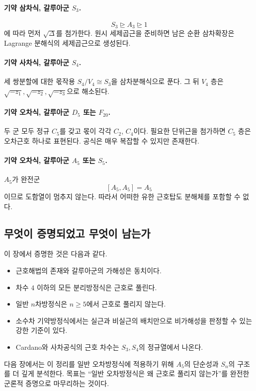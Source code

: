 \paragraph{기약 삼차식, 갈루아군 $S_3$.}
\[
  S_3\trianglerighteq A_3\trianglerighteq1
\]
에 따라 먼저 $\sqrt\Delta$를 첨가한다. 원시 세제곱근을 준비하면 남은 순환 삼차확장은 Lagrange 분해식의 세제곱근으로 생성된다.

\paragraph{기약 사차식, 갈루아군 $S_4$.}
세 쌍분할에 대한 몫작용 $S_4/V_4\cong S_3$을 삼차분해식으로 푼다. 그 뒤 $V_4$ 층은 $\sqrt{-z_1},\sqrt{-z_2},\sqrt{-z_3}$으로 해소된다.

\paragraph{기약 오차식, 갈루아군 $D_5$ 또는 $F_{20}$.}
두 군 모두 정규 $C_5$를 갖고 몫이 각각 $C_2$, $C_4$이다. 필요한 단위근을 첨가하면 $C_5$ 층은 오차근호 하나로 표현된다. 공식은 매우 복잡할 수 있지만 존재한다.

\paragraph{기약 오차식, 갈루아군 $A_5$ 또는 $S_5$.}
$A_5$가 완전군
\[
  [A_5,A_5]=A_5
\]
이므로 도함열이 멈추지 않는다. 따라서 어떠한 유한 근호탑도 분해체를 포함할 수 없다.

\subsection{무엇이 증명되었고 무엇이 남는가}

이 장에서 증명한 것은 다음과 같다.
\begin{itemize}
  \item 근호해법의 존재와 갈루아군의 가해성은 동치이다.
  \item 차수 $4$ 이하의 모든 분리방정식은 근호로 풀린다.
  \item 일반 $n$차방정식은 $n\ge5$에서 근호로 풀리지 않는다.
  \item 소수차 기약방정식에서는 실근과 비실근의 배치만으로 비가해성을 판정할 수 있는 강한 기준이 있다.
  \item Cardano와 사차공식의 근호 차수는 $S_3,S_4$의 정규열에서 나온다.
\end{itemize}

다음 장에서는 이 정리를 일반 오차방정식에 적용하기 위해 $A_5$의 단순성과 $S_n$의 구조를 더 깊게 분석한다. 목표는 ``일반 오차방정식은 왜 근호로 풀리지 않는가''를 완전한 군론적 증명으로 마무리하는 것이다.

